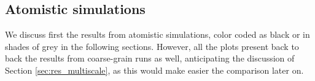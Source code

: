 \subsection{Atomistic simulations}

We discuss first the results from atomistic simulations, color coded as black or in shades of grey in the following sections. However, all the plots present back to back the results from coarse-grain runs as well, anticipating the discussion of Section \ref{sec:res_multiscale}, as this would make easier the comparison later on.

\begin{figure}[p!]
\centering
{} 
 \\

\end{figure}

